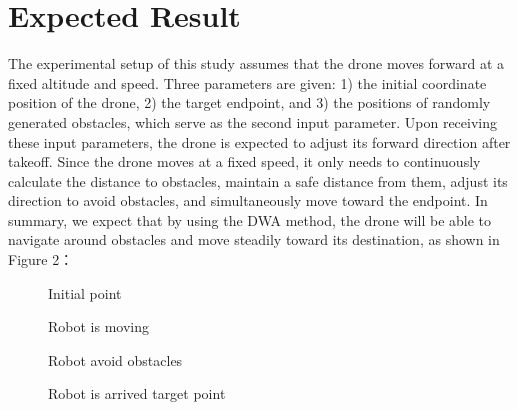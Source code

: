 \documentclass[crop=false]{standalone}
\begin{document}
	\section{Expected Result}
	 
	 The experimental setup of this study assumes that the drone moves forward at a fixed altitude and speed. Three parameters are given: 1) the initial coordinate position of the drone, 2) the target endpoint, and 3) the positions of randomly generated obstacles, which serve as the second input parameter. Upon receiving these input parameters, the drone is expected to adjust its forward direction after takeoff. Since the drone moves at a fixed speed, it only needs to continuously calculate the distance to obstacles, maintain a safe distance from them, adjust its direction to avoid obstacles, and simultaneously move toward the endpoint. In summary, we expect that by using the DWA method, the drone will be able to navigate around obstacles and move steadily toward its destination, as shown in Figure 2：  
	
	\begin{figure}[htbp]	
		\centering
		\begin{minipage}{0.49\linewidth}
			\centering
			\caption{Initial point}
			\label{Initial robot point}%
		\end{minipage}
		\begin{minipage}{0.49\linewidth}
			\centering
			\caption{Robot is moving}
			\label{Moving robot}%
		\end{minipage}
		
		\begin{minipage}{0.49\linewidth}
			\centering
			\caption{Robot avoid obstacles}
			\label{Robot avoid obstacles}%
		\end{minipage}
		\begin{minipage}{0.49\linewidth}
			\centering
			\caption{Robot is arrived target point}
			\label{Robot is arrived target point}%
		\end{minipage}
		
	\end{figure}
\end{document}

